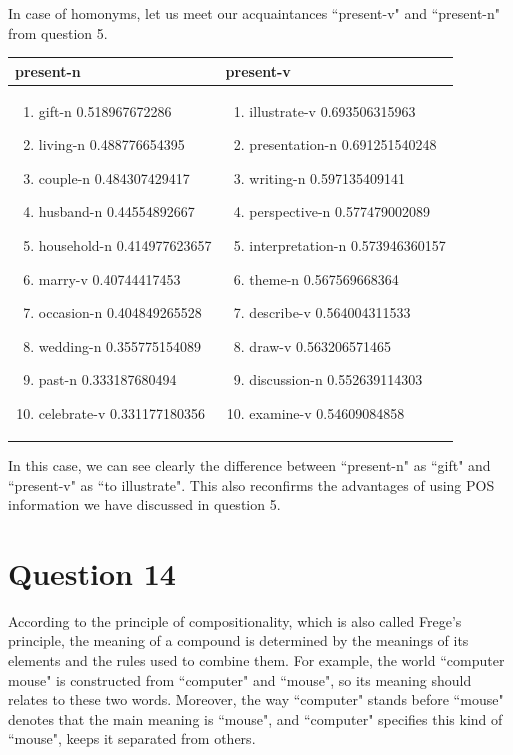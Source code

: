 \documentclass[12pt]{article}
\begin{document}
In case of homonyms, let us meet our acquaintances ``present-v" and ``present-n" from question 5.
\begin{longtable}{ p{7cm} | p{7cm} }
	\textbf{present-n} & \textbf{present-v}\\
	\hline
	\begin{enumerate}
		\item gift-n 0.518967672286
		\item living-n 0.488776654395
		\item couple-n 0.484307429417
		\item husband-n 0.44554892667
		\item household-n 0.414977623657
		\item marry-v 0.40744417453
		\item occasion-n 0.404849265528
		\item wedding-n 0.355775154089
		\item past-n 0.333187680494
		\item celebrate-v 0.331177180356
	\end{enumerate}
	&
	\begin{enumerate}
		\item illustrate-v 0.693506315963
		\item presentation-n 0.691251540248
		\item writing-n 0.597135409141
		\item perspective-n 0.577479002089
		\item interpretation-n 0.573946360157
		\item theme-n 0.567569668364
		\item describe-v 0.564004311533
		\item draw-v 0.563206571465
		\item discussion-n 0.552639114303
		\item examine-v 0.54609084858
	\end{enumerate}
	\\
\end{longtable}

In this case, we can see clearly the difference between ``present-n" as ``gift" and ``present-v" as ``to illustrate". This also reconfirms the advantages of using POS information we have discussed in question 5.

\section{Question 14}
According to the principle of compositionality, which is also called Frege's principle, the meaning of a compound is determined by the meanings of its elements and the rules used to combine them. For example, the world ``computer mouse" is constructed from ``computer" and ``mouse", so its meaning should relates to these two words. Moreover, the way ``computer" stands before ``mouse" denotes that the main meaning is ``mouse", and ``computer" specifies this kind of ``mouse", keeps it separated from others.
\end{document}
